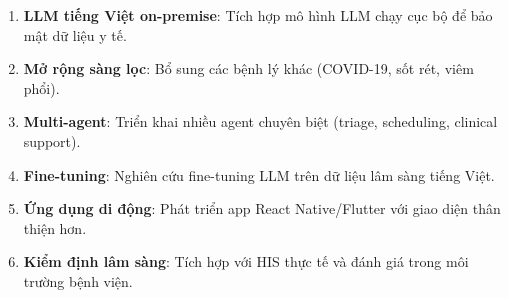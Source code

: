 \documentclass[oneside, a4paper]{book}
\theoremstyle{plain}
\theoremstyle{plain}
\theoremstyle{definition}
\theoremstyle{remark}
\begin{document}
\begin{enumerate}
  \item \textbf{LLM tiếng Việt on-premise}: Tích hợp mô hình LLM chạy cục bộ để bảo mật dữ liệu y tế.
  \item \textbf{Mở rộng sàng lọc}: Bổ sung các bệnh lý khác (COVID-19, sốt rét, viêm phổi).
  \item \textbf{Multi-agent}: Triển khai nhiều agent chuyên biệt (triage, scheduling, clinical support).
  \item \textbf{Fine-tuning}: Nghiên cứu fine-tuning LLM trên dữ liệu lâm sàng tiếng Việt.
  \item \textbf{Ứng dụng di động}: Phát triển app React Native/Flutter với giao diện thân thiện hơn.
  \item \textbf{Kiểm định lâm sàng}: Tích hợp với HIS thực tế và đánh giá trong môi trường bệnh viện.
\end{enumerate}
\end{document}

